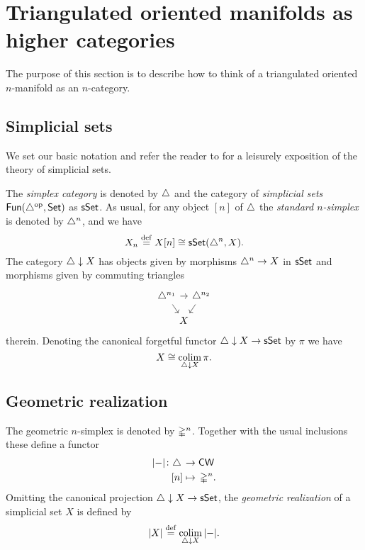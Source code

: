 
\section{Triangulated oriented manifolds as higher categories}

The purpose of this section is to describe how to think of a triangulated oriented $n$-manifold as an $n$-category.

\subsection{Simplicial sets}

We set our basic notation and refer the reader to \cite{friedman2021simplicial} for a leisurely exposition of the theory of simplicial sets.

The \textit{simplex category} is denoted by $\triangle$ and the category of \textit{simplicial sets} $\mathsf{Fun}(\triangle^{\mathrm{op}}, \mathsf{Set})$ as $\mathsf{sSet}$.
As usual, for any object $[n]$ of $\triangle$ the \textit{standard $n$-simplex} is denoted by $\triangle^n$, and we have
\[
X_n \stackrel{\mathrm{def}}{=} X[n] \cong \mathsf{sSet}(\triangle^n, X).
\]
The category $\triangle \downarrow X$ has objects given by morphisms $\triangle^n \to X$ in $\mathsf{sSet}$ and morphisms given by commuting triangles
\[
\begin{tikzcd}[column sep=-5pt, row sep=small]
	\simplex^{n_1} \arrow[dr] \arrow[rr] & & \simplex^{n_2}  \arrow[dl] \\
	& X &
\end{tikzcd}
\]
therein.
Denoting the canonical forgetful functor $\triangle \downarrow X \to \mathsf{sSet}$ by $\pi$ we have
\[
X \cong \operatorname*{colim}_{\triangle \downarrow X} \pi.
\]

\subsection{Geometric realization}

The geometric $n$-simplex is denoted by $\mathbb{\Delta}^n$.
Together with the usual inclusions these define a functor
\[
\begin{split}
	\lvert-\rvert \colon \triangle \, &\to \mathsf{CW} \\
	[n] &\mapsto \, \mathbb{\Delta}^n.
\end{split}
\]
Omitting the canonical projection $\triangle \downarrow X \to \mathsf{sSet}$, the \textit{geometric realization} of a simplicial set $X$ is defined by
\[
\lvert X\rvert \stackrel{\mathrm{def}}{=} \operatorname*{colim}_{\triangle \downarrow X} \,\lvert-\rvert.
\]

